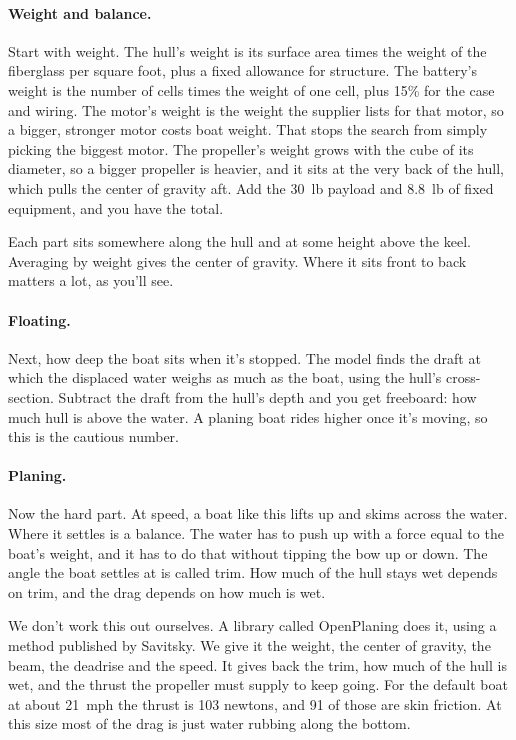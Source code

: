 \documentclass[11pt,a4paper]{article}
\renewcommand{\_}{\textunderscore\allowbreak}
\begin{document}
\paragraph{Weight and balance.} Start with weight. The hull's weight is its surface area times the weight of the fiberglass per square foot, plus a fixed allowance for structure.
The battery's weight is the number of cells times the weight of one cell, plus 15\% for the case and wiring. The motor's weight is the weight the supplier lists for that motor, so a bigger, stronger motor costs boat weight. That stops the search from simply picking the biggest motor. The propeller's weight grows with the cube of its diameter, so a bigger propeller is heavier, and it sits at the very back of the hull, which pulls the center of gravity aft.
Add the 30~lb payload and 8.8~lb of fixed equipment, and you have the total.

Each part sits somewhere along the hull and at some height above the keel. Averaging by weight gives the center of gravity. Where it sits front to back matters a lot, as you'll see.

\paragraph{Floating.} Next, how deep the boat sits when it's stopped. The model finds the draft at which the displaced water weighs as much as the boat, using the hull's cross-section.
Subtract the draft from the hull's depth and you get freeboard: how much hull is above the water. A planing boat rides higher once it's moving, so this is the cautious number.

\paragraph{Planing.} Now the hard part. At speed, a boat like this lifts up and skims across the water. Where it settles is a balance. The water has to push up with a force equal to the boat's weight,
and it has to do that without tipping the bow up or down. The angle the boat settles at is called trim. How much of the hull stays wet depends on trim, and the drag depends on how much is wet.

We don't work this out ourselves. A library called OpenPlaning does it, using a method published by Savitsky. We give it the weight, the center of gravity, the beam, the deadrise and the speed.
It gives back the trim, how much of the hull is wet, and the thrust the propeller must supply to keep going. For the default boat at about 21~mph the thrust is 103 newtons, and 91 of those are skin friction.
At this size most of the drag is just water rubbing along the bottom.
\end{document}
